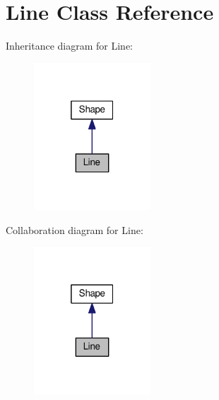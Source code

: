 \hypertarget{classLine}{}\section{Line Class Reference}
\label{classLine}


Inheritance diagram for Line\+:
\nopagebreak
\begin{figure}[H]
\begin{center}
\leavevmode
\includegraphics[width=124pt]{classLine__inherit__graph}
\end{center}
\end{figure}


Collaboration diagram for Line\+:
\nopagebreak
\begin{figure}[H]
\begin{center}
\leavevmode
\includegraphics[width=124pt]{classLine__coll__graph}
\end{center}
\end{figure}
